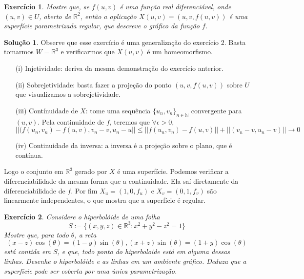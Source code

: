 \documentclass[a4paper,12pt]{article}
\newcommand{\R}{\mathbb{R}}
\theoremstyle{exer}
\newtheorem{exercise}{Exercício}
\theoremstyle{definition}
\newtheorem{solution}{Solução}
\theoremstyle{plain}
\begin{document}
\begin{exercise}
    Mostre que, se $f(u, v)$ é uma função real diferenciável, onde $(u, v) \in
    U$, aberto de $\R^2$, então a aplicação $X(u, v) = (u, v, f(u, v))$ é uma
    superfície parametrizada regular, que descreve o gráfico da função $f$.
\end{exercise}

\begin{solution}
    Observe que esse exercício é uma generalização do exercício 2. Basta
    tomarmos $W = \R^3$ e verificarmos que $X(u,v)$ é um homeomorfismo. 

    \begin{enumerate}
        \item[(i)] Injetividade: deriva da mesma demonstração do exercício
        anterior. 
        \item[(ii)] Sobrejetividade: basta fazer a projeção do ponto
        $(u,v,f(u,v))$ sobre $U$ que visualizamos a sobrejetividade. 
        \item[(iii)] Contínuidade de $X$: tome uma sequência $\{u_n, v_n\}_{n \in
        \mathbb{N}}$ convergente para $(u,v)$. Pela continuidade de $f$,
        teremos que $\forall \epsilon > 0$, 
        $$
        ||(f(u_n, v_n) - f(u,v), v_n - v, u_n - u|| \le ||f(u_n, v_n) - f(u,v)|| + ||(v_n - v, u_n - v)|| \to 0
        $$
        \item[(iv)] Continuidade da inversa: a inversa é a projeção sobre o
        plano, que é contínua. 
    \end{enumerate}
    Logo o conjunto em $\R^3$ gerado por $X$ é uma superfície. Podemos
    verificar a diferenciabilidade da mesma forma que a continuidade. Ela saí
    diretamente da diferenciabilidade de $f$. Por fim 
    $X_u = (1,0,f_u)$ e $X_v = (0,1,f_v)$ são linearmente independentes, o que
    mostra que a superfície é regular. 
\end{solution}

\begin{exercise}
    Considere o hiperbolóide de uma folha
    $$
    S := \{(x, y, z) \in \R^3 : x^2 + y^2 - z^2 = 1\}
    $$
    Mostre que, para todo $\theta$, a reta
    $$
    (x - z)\cos(\theta) = (1 - y)\sin(\theta), (x + z)\sin(\theta) = (1 + y)\cos(\theta)
    $$
    está contida em $S$, e que, todo ponto do hiperboloide está em alguma
    dessas linhas. Desenhe o hiperbolóide e as linhas em um ambiente gráfico.
    Deduza que a superfície pode ser coberta por uma única parametrização.
\end{exercise}
\end{document}
